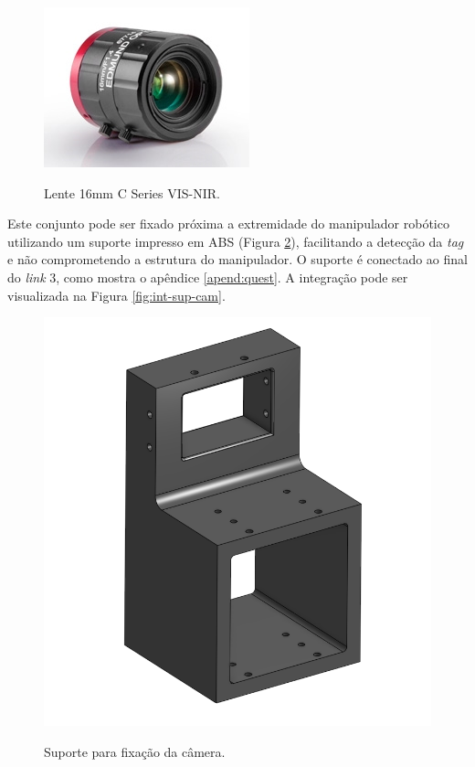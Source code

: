 \begin{figure}[H]
    \centering
    \caption{Lente 16mm C Series VIS-NIR.}
    \includegraphics[scale=0.8]{images/lens.png}
    \label{fig:lens}
\end{figure}

Este conjunto pode ser fixado próxima a extremidade do manipulador robótico utilizando um suporte impresso em ABS (Figura \ref{fig:sup-cam}), facilitando a detecção da \emph{tag} e não comprometendo a estrutura do manipulador. O suporte é conectado ao final do \textit{link} 3, como mostra o apêndice \ref{apend:quest}. A integração pode ser visualizada na Figura \ref{fig:int-sup-cam}.

\begin{figure}[H]
    \centering
    \caption{Suporte para fixação da câmera.}
    \includegraphics[scale=0.3]{images/sup-cam.png}
    \label{fig:sup-cam}
\end{figure}


